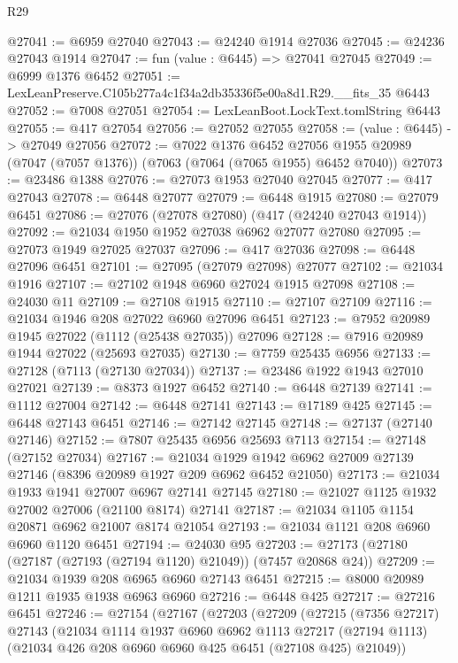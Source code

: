 \begin{lexlean}{R29}
\begin{coremodule}
@27041 := @6959 @27040
@27043 := @24240 @1914 @27036
@27045 := @24236 @27043 @1914
@27047 := fun (value : @6445) => @27041 @27045
@27049 := @6999 @1376 @6452
@27051 := LexLeanPreserve.C105b277a4c1f34a2db35336f5e00a8d1.R29.__fits_35 @6443
@27052 := @7008 @27051
@27054 := LexLeanBoot.LockText.tomlString @6443
@27055 := @417 @27054
@27056 := @27052 @27055
@27058 := (value : @6445) -> @27049 @27056
@27072 := @7022
    @1376
    @6452
    @27056
    @1955
    @20989
    (@7047 (@7057 @1376))
    (@7063 (@7064 (@7065 @1955) @6452 @7040))
@27073 := @23486 @1388
@27076 := @27073 @1953 @27040 @27045
@27077 := @417 @27043
@27078 := @6448 @27077
@27079 := @6448 @1915
@27080 := @27079 @6451
@27086 := @27076 (@27078 @27080) (@417 (@24240 @27043 @1914))
@27092 := @21034 @1950 @1952 @27038 @6962 @27077 @27080
@27095 := @27073 @1949 @27025 @27037
@27096 := @417 @27036
@27098 := @6448 @27096 @6451
@27101 := @27095 (@27079 @27098) @27077
@27102 := @21034 @1916
@27107 := @27102 @1948 @6960 @27024 @1915 @27098
@27108 := @24030 @11
@27109 := @27108 @1915
@27110 := @27107 @27109
@27116 := @21034 @1946 @208 @27022 @6960 @27096 @6451
@27123 := @7952 @20989 @1945 @27022 (@1112 (@25438 @27035)) @27096
@27128 := @7916 @20989 @1944 @27022 (@25693 @27035)
@27130 := @7759 @25435 @6956
@27133 := @27128 (@7113 (@27130 @27034))
@27137 := @23486 @1922 @1943 @27010 @27021
@27139 := @8373 @1927 @6452
@27140 := @6448 @27139
@27141 := @1112 @27004
@27142 := @6448 @27141
@27143 := @17189 @425
@27145 := @6448 @27143 @6451
@27146 := @27142 @27145
@27148 := @27137 (@27140 @27146)
@27152 := @7807 @25435 @6956 @25693 @7113
@27154 := @27148 (@27152 @27034)
@27167 := @21034 @1929 @1942 @6962 @27009 @27139 @27146 (@8396 @20989 @1927 @209 @6962 @6452 @21050)
@27173 := @21034 @1933 @1941 @27007 @6967 @27141 @27145
@27180 := @21027 @1125 @1932 @27002 @27006 (@21100 @8174) @27141
@27187 := @21034 @1105 @1154 @20871 @6962 @21007 @8174 @21054
@27193 := @21034 @1121 @208 @6960 @6960 @1120 @6451
@27194 := @24030 @95
@27203 := @27173 (@27180 (@27187 (@27193 (@27194 @1120) @21049)) (@7457 @20868 @24))
@27209 := @21034 @1939 @208 @6965 @6960 @27143 @6451
@27215 := @8000 @20989 @1211 @1935 @1938 @6963 @6960
@27216 := @6448 @425
@27217 := @27216 @6451
@27246 := @27154
    (@27167
      (@27203
        (@27209
          (@27215
            (@7356 @27217)
            @27143
            (@21034
              @1114
              @1937
              @6960
              @6962
              @1113
              @27217
              (@27194 @1113)
              (@21034 @426 @208 @6960 @6960 @425 @6451 (@27108 @425) @21049))

\end{coremodule}
\end{lexlean}
